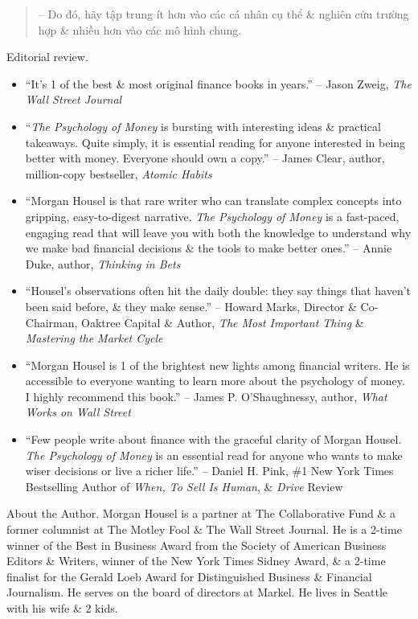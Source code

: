 \documentclass{article}
\begin{document}
\begin{enumerate}
\begin{quotation}
		-- Do đó, hãy tập trung ít hơn vào các cá nhân cụ thể \& nghiên cứu trường hợp \& nhiều hơn vào các mô hình chung.
	\end{quotation}
	{\sf Editorial review.}
	\begin{itemize}
		\item ``It's 1 of the best \& most original finance books in years.'' -- {\sc Jason Zweig}, {\it The Wall Street Journal}
		\item ``{\it The Psychology of Money} is bursting with interesting ideas \& practical takeaways. Quite simply, it is essential reading for anyone interested in being better with money. Everyone should own a copy.'' -- {\sc James Clear}, author, million-copy bestseller, {\it Atomic Habits}
		\item ``{\sc Morgan Housel} is that rare writer who can translate complex concepts into gripping, easy-to-digest narrative. {\it The Psychology of Money} is a fast-paced, engaging read that will leave you with both the knowledge to understand why we make bad financial decisions \& the tools to make better ones.'' -- {\sc Annie Duke}, author, {\it Thinking in Bets}
		\item ``{\sc Housel}'s observations often hit the daily double: they say things that haven't been said before, \& they make sense.'' -- {\sc Howard Marks}, Director \& Co-Chairman, Oaktree Capital \& Author, {\it The Most Important Thing} \& {\it Mastering the Market Cycle}
		\item ``{\sc Morgan Housel} is 1 of the brightest new lights among financial writers. He is accessible to everyone wanting to learn more about the psychology of money. I highly recommend this book.'' -- {\sc James P. O'Shaughnessy}, author, {\it What Works on Wall Street}
		\item ``Few people write about finance with the graceful clarity of {\sc Morgan Housel}. {\it The Psychology of Money} is an essential read for anyone who wants to make wiser decisions or live a richer life.'' -- {\sc Daniel H. Pink}, \#1 New York Times Bestselling Author of {\it When, To Sell Is Human}, \& {\it Drive} Review		
	\end{itemize}
	{\sf About the Author.} {\sc Morgan Housel} is a partner at The Collaborative Fund \& a former columnist at The Motley Fool \& The Wall Street Journal. He is a 2-time winner of the Best in Business Award from the Society of American Business Editors \& Writers, winner of the New York Times Sidney Award, \& a 2-time finalist for the Gerald Loeb Award for Distinguished Business \& Financial Journalism. He serves on the board of directors at Markel. He lives in Seattle with his wife \& 2 kids.
	

\end{enumerate}
\end{document}
